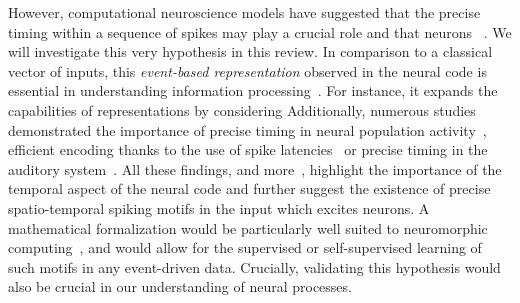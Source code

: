 \documentclass[brainsci, %
               review,submit,pdftex,moreauthors
               ]{Definitions/mdpi}
\begin{document}
However, computational neuroscience models have suggested that the precise timing within a sequence of spikes may play a crucial role and that neurons ~\citep{abeles_role_1982}. We will investigate this very hypothesis in this review. %
In comparison to a classical  vector of inputs, this \emph{event-based representation} observed in the neural code is essential in understanding information processing~\citep{carr_processing_1993}. For instance, it expands the capabilities of representations  by considering   Additionally, numerous studies demonstrated the importance of precise timing in neural population activity~\citep{davis_spontaneous_2021}, efficient encoding thanks to the use of spike latencies~\citep{perrinet_coding_2004,gollisch_rapid_2008} or precise timing in the auditory system~\citep{deweese_binary_2003,carr_circuit_1990}. All these findings, and more~\citep{bohte_evidence_2004,dilorenzo_spike_2013}, highlight the importance of the temporal aspect of the neural code and further suggest the existence of precise spatio-temporal spiking motifs in the input which excites neurons. A mathematical formalization would be particularly well suited to neuromorphic computing~\citep{roy_towards_2019}, and would allow for the supervised or self-supervised learning of such motifs in any event-driven data.  Crucially, validating this hypothesis would also be crucial in our understanding of neural processes. %
%
\end{document}
